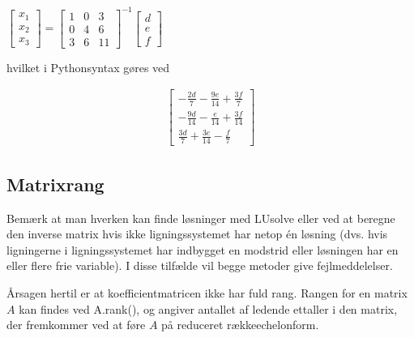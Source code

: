 \documentclass[letterpaper,10pt,english]{jupyterBook}
\begin{document}
\(\displaystyle \left[\begin{matrix}x_{1}\\x_{2}\\x_{3}\end{matrix}\right] = 
    \displaystyle \left[\begin{matrix}1 & 0 & 3\\0 & 4 & 6\\3 & 6 & 11\end{matrix}\right]^{-1}
    \displaystyle \left[\begin{matrix}d\\e\\f\end{matrix}\right]\)

hvilket i Python\sphinxhyphen{}syntax gøres ved

\begin{sphinxVerbatim}[commandchars=\\\{\}]
  
\end{sphinxVerbatim}
\begin{equation*}
\begin{split}\displaystyle \left[\begin{matrix}- \frac{2 d}{7} - \frac{9 e}{14} + \frac{3 f}{7}\\- \frac{9 d}{14} - \frac{e}{14} + \frac{3 f}{14}\\\frac{3 d}{7} + \frac{3 e}{14} - \frac{f}{7}\end{matrix}\right]\end{split}
\end{equation*}

\subsection{Matrixrang}
\label{\detokenize{notebooks/sympy/Notebook_LinAlg1_5:matrixrang}}
Bemærk at man hverken kan finde løsninger med LUsolve eller ved at beregne den inverse matrix hvis ikke ligningssystemet har netop én løsning (dvs. hvis ligningerne i ligningssystemet har indbygget en modstrid eller løsningen har en eller flere frie variable). I disse tilfælde vil begge metoder give fejlmeddelelser.

Årsagen hertil er at koefficientmatricen ikke har fuld rang. Rangen for en matrix \(A\) kan findes ved A.rank(), og angiver antallet af ledende et\sphinxhyphen{}taller i den matrix, der fremkommer ved at føre \(A\) på reduceret række\sphinxhyphen{}echelonform.
\end{document}
